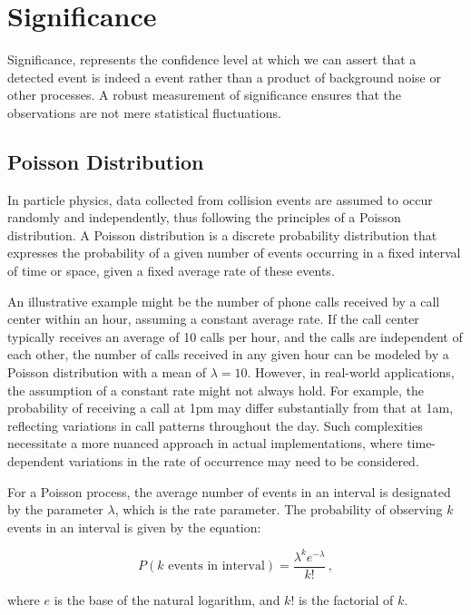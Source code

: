 \section{Significance}

Significance, represents the confidence level at which we can assert that a detected event is
indeed a \tth event rather than a product of background noise or other processes. A robust measurement of significance
ensures that the observations are not mere statistical fluctuations.

\subsection{Poisson Distribution}

In particle physics, data collected from collision events are assumed to occur randomly and independently, thus
following the principles of a Poisson distribution. A Poisson distribution is a discrete probability distribution that
expresses the probability of a given number of events occurring in a fixed interval of time or space, given a fixed
average rate of these events.

An illustrative example might be the number of phone calls received by a call center within an hour, assuming a constant
average rate. If the call center typically receives an average of 10 calls per hour, and the calls are independent of
each other, the number of calls received in any given hour can be modeled by a Poisson distribution with a mean of
$\lambda = 10$. However, in real-world applications, the assumption of a constant rate might not always hold. For
example, the probability of receiving a call at 1pm may differ substantially from that at 1am, reflecting variations in
call patterns throughout the day. Such complexities necessitate a more nuanced approach in actual implementations, where
time-dependent variations in the rate of occurrence may need to be considered.

For a Poisson process, the average number of events in an interval is designated by the parameter
$\lambda$, which is
the rate parameter. The probability of observing $k$ events in an interval is given by the equation:

\begin{equation}
    P(k \text{ events in interval}) = \frac{\lambda^k e^{-\lambda}}{k!}\,,
\end{equation}

where $e$ is the base of the natural logarithm, and $k!$ is the factorial of $k$.

